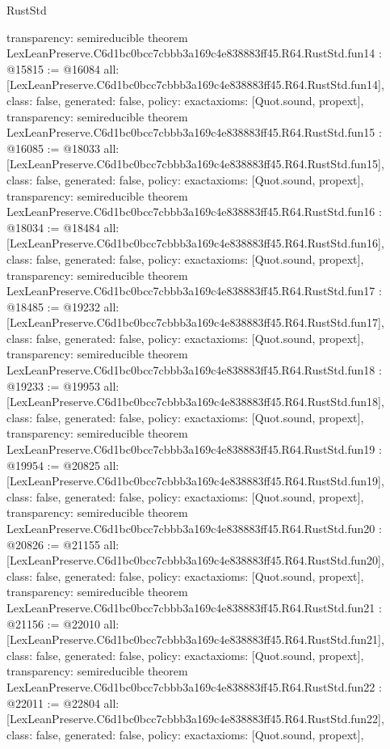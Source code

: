 \begin{lexlean}{RustStd}
\begin{coremodule}
{  transparency: semireducible
}
theorem LexLeanPreserve.C6d1bc0bcc7cbbb3a169c4e838883ff45.R64.RustStd.fun14 : @15815 := @16084 {
  all: [LexLeanPreserve.C6d1bc0bcc7cbbb3a169c4e838883ff45.R64.RustStd.fun14],
  class: false,
  generated: false,
  policy: exact{axioms: [Quot.sound, propext]},
  transparency: semireducible
}
theorem LexLeanPreserve.C6d1bc0bcc7cbbb3a169c4e838883ff45.R64.RustStd.fun15 : @16085 := @18033 {
  all: [LexLeanPreserve.C6d1bc0bcc7cbbb3a169c4e838883ff45.R64.RustStd.fun15],
  class: false,
  generated: false,
  policy: exact{axioms: [Quot.sound, propext]},
  transparency: semireducible
}
theorem LexLeanPreserve.C6d1bc0bcc7cbbb3a169c4e838883ff45.R64.RustStd.fun16 : @18034 := @18484 {
  all: [LexLeanPreserve.C6d1bc0bcc7cbbb3a169c4e838883ff45.R64.RustStd.fun16],
  class: false,
  generated: false,
  policy: exact{axioms: [Quot.sound, propext]},
  transparency: semireducible
}
theorem LexLeanPreserve.C6d1bc0bcc7cbbb3a169c4e838883ff45.R64.RustStd.fun17 : @18485 := @19232 {
  all: [LexLeanPreserve.C6d1bc0bcc7cbbb3a169c4e838883ff45.R64.RustStd.fun17],
  class: false,
  generated: false,
  policy: exact{axioms: [Quot.sound, propext]},
  transparency: semireducible
}
theorem LexLeanPreserve.C6d1bc0bcc7cbbb3a169c4e838883ff45.R64.RustStd.fun18 : @19233 := @19953 {
  all: [LexLeanPreserve.C6d1bc0bcc7cbbb3a169c4e838883ff45.R64.RustStd.fun18],
  class: false,
  generated: false,
  policy: exact{axioms: [Quot.sound, propext]},
  transparency: semireducible
}
theorem LexLeanPreserve.C6d1bc0bcc7cbbb3a169c4e838883ff45.R64.RustStd.fun19 : @19954 := @20825 {
  all: [LexLeanPreserve.C6d1bc0bcc7cbbb3a169c4e838883ff45.R64.RustStd.fun19],
  class: false,
  generated: false,
  policy: exact{axioms: [Quot.sound, propext]},
  transparency: semireducible
}
theorem LexLeanPreserve.C6d1bc0bcc7cbbb3a169c4e838883ff45.R64.RustStd.fun20 : @20826 := @21155 {
  all: [LexLeanPreserve.C6d1bc0bcc7cbbb3a169c4e838883ff45.R64.RustStd.fun20],
  class: false,
  generated: false,
  policy: exact{axioms: [Quot.sound, propext]},
  transparency: semireducible
}
theorem LexLeanPreserve.C6d1bc0bcc7cbbb3a169c4e838883ff45.R64.RustStd.fun21 : @21156 := @22010 {
  all: [LexLeanPreserve.C6d1bc0bcc7cbbb3a169c4e838883ff45.R64.RustStd.fun21],
  class: false,
  generated: false,
  policy: exact{axioms: [Quot.sound, propext]},
  transparency: semireducible
}
theorem LexLeanPreserve.C6d1bc0bcc7cbbb3a169c4e838883ff45.R64.RustStd.fun22 : @22011 := @22804 {
  all: [LexLeanPreserve.C6d1bc0bcc7cbbb3a169c4e838883ff45.R64.RustStd.fun22],
  class: false,
  generated: false,
  policy: exact{axioms: [Quot.sound, propext]},
}
\end{coremodule}
\end{lexlean}
